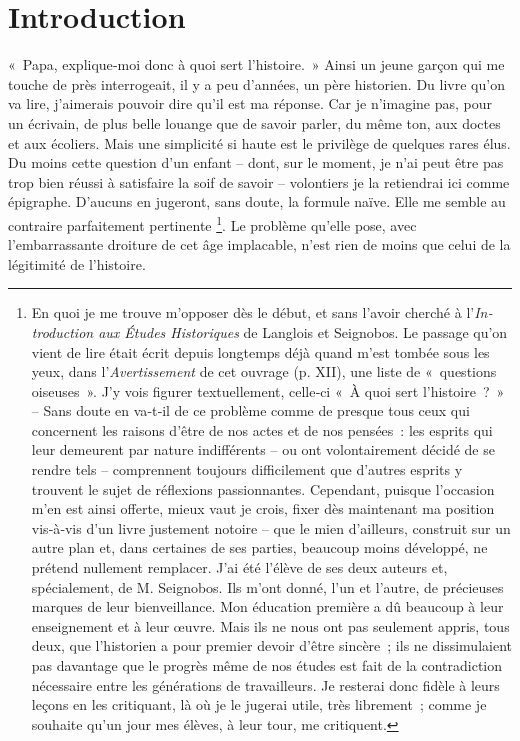 \documentclass[french,twoside]{book} %
\newcommand{\dateline}[1]{\medskip{\RaggedLeft{#1}\par}\bigskip}
\begin{document}
\dateline{Fougères (Creuse) \\
le 10 mai 1941.}
\section[{Introduction}]{Introduction}\renewcommand{\leftmark}{Introduction}

\noindent  {}
\label{pIX} « Papa, explique‑moi donc à quoi sert l’histoire. » Ainsi un jeune garçon qui me touche de près interrogeait, il y a peu d’années, un père historien. Du livre qu’on va lire, j’aimerais pouvoir dire qu’il est ma réponse. Car je n’imagine pas, pour un écrivain, de plus belle louange que de savoir parler, du même ton, aux doctes et aux écoliers. Mais une simplicité si haute est le privilège de quelques rares élus. Du moins cette question d’un enfant – dont, sur le moment, je n’ai peut être pas trop bien réussi à satisfaire la soif de savoir – volontiers je la retiendrai ici comme épi­graphe. D’aucuns en jugeront, sans doute, la formule naïve. Elle me semble au contraire parfaitement pertinente \footnote{En quoi je me trouve m’opposer dès le début, et sans l’avoir cherché à l’\emph{In­troduction aux Études Historiques} de Langlois et Seignobos. Le passage qu’on vient de lire était écrit depuis longtemps déjà quand m’est tombée sous les yeux, dans l’\emph{Avertissement} de cet ouvrage (p. XII), une liste de « questions oiseuses ». J’y vois figurer textuellement, celle‑ci « À quoi sert l’histoire ? » – Sans doute en va‑t‑il de ce problème comme de presque tous ceux qui concernent les raisons d’être de nos actes et de nos pensées : les esprits qui leur demeurent par nature indifférents – ou ont volontairement décidé de se rendre tels – comprennent toujours difficilement que d’autres esprits y trouvent le sujet de réflexions pas­sionnantes. Cependant, puisque l’occasion m’en est ainsi offerte, mieux vaut je crois, fixer dès maintenant ma position vis‑à‑vis d’un livre justement notoire – que le mien d’ailleurs, construit sur un autre plan et, dans certaines de ses parties, beaucoup moins développé, ne prétend nullement remplacer. J’ai été l’élève de ses deux auteurs et, spécialement, de M. Seignobos. Ils m’ont donné, l’un et l’autre, de précieuses marques de leur bienveillance. Mon éducation pre­mière a dû beaucoup à leur enseignement et à leur œuvre. Mais ils ne nous ont pas seulement appris, tous deux, que l’historien a pour premier devoir d’être sincère ; ils ne dissimulaient pas davantage que le progrès même de nos études est fait de la contradiction nécessaire entre les générations de travailleurs. Je resterai donc fidèle à leurs leçons en les critiquant, là où je le jugerai utile, très librement ; comme je souhaite qu’un jour mes élèves, à leur tour, me critiquent.}. Le problème qu’elle pose, avec l’embarrassante droiture de cet âge implacable, n’est rien de moins que celui de la légitimité de l’histoire.\par
\end{document}

